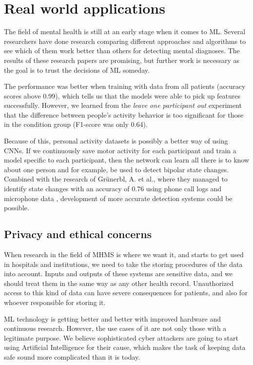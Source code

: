 \section{Real world applications}

The field of mental health is still at an early stage when it comes to ML. Several researchers have done research comparing different approaches and algorithms to see which of them work better than others for detecting mental diagnoses. The results of these research papers are promising, but further work is necessary as the goal is to trust the decisions of ML someday. 

The performance was better when training with data from all patients (accuracy scores above 0.99), which tells us that the models were able to pick up features successfully. However, we learned from the \textit{leave one participant out} experiment that the difference between people's activity behavior is too significant for those in the condition group (F1-score was only 0.64). 

Because of this, personal activity datasets is possibly a better way of using CNNs. If we continuously save motor activity for each participant and train a model specific to each participant, then the network can learn all there is to know about one person and for example, be used to detect bipolar state changes. Combined with the research of Grünerbl, A. et al., where they managed to identify state changes with an accuracy of 0.76 using phone call logs and microphone data \cite{grunerbl_smartphone_bipolar}, development of more accurate detection systems could be possible.

\subsection{Privacy and ethical concerns}
When research in the field of MHMS is where we want it, and starts to get used in hospitals and institutions, we need to take the storing procedures of the data into account. Inputs and outputs of these systems are sensitive data, and we should treat them in the same way as any other health record. Unauthorized access to this kind of data can have severe consequences for patients, and also for whoever responsible for storing it. 

ML technology is getting better and better with improved hardware and continuous research. However, the use cases of it are not only those with a legitimate purpose. We believe sophisticated cyber attackers are going to start using Artificial Intelligence for their cause, which makes the task of keeping data safe sound more complicated than it is today. 

